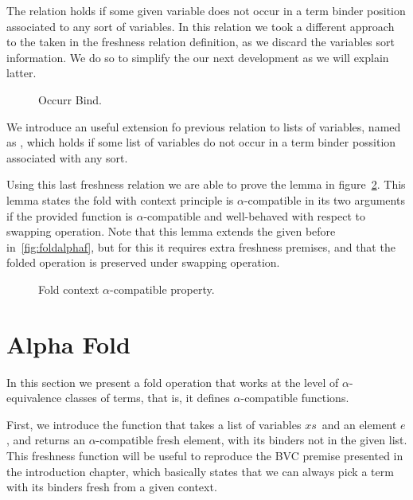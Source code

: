 \documentclass{book}
\newcommand{\alp}{\ensuremath{\alpha}}
\begin{document}
{The  relation holds if some given variable does not occur in a term binder position associated to any sort of variables. In this relation we took a different approach to the taken in the freshness relation definition, as we discard the variables sort information. We do so to simplify the our next development as we will explain latter.  %

\begin{figure}[h]
  \caption{Occurr Bind.}
\label{fig:notOccurrBind}
\end{figure}


We introduce an useful extension fo previous relation to lists of variables, named as , which holds if some list of variables do not occur in a term binder possition associated with any sort. 

Using this last freshness relation we are able to prove the lemma in figure~\ref{fig:foldalphacomp}. This lemma states the fold with context principle is \alp-compatible in its two arguments if the provided function is \alp-compatible and well-behaved with respect to swapping operation. Note that this lemma extends the given before in~\ref{fig:foldalphaf}, but for this it requires extra freshness premises, and that the folded operation is preserved under swapping operation.

\begin{figure}[h!]
  \caption{Fold context \alp-compatible property.}
\label{fig:foldalphacomp}
\end{figure}

  

  
\section{Alpha Fold} \label{sec:alphafold}
  
In this section we present a fold operation that works at the level of \alp-equivalence classes of terms, that is, it defines \alp-compatible functions. 

First, we introduce the function  that takes a list of variables $xs$\ and an element $e$, and returns an \alp-compatible fresh element, with its binders not in the given list. This freshness function will be useful to reproduce the BVC premise presented in the introduction chapter, which basically states that we can always pick a term with its binders fresh from a given context. 

}
\end{document}
